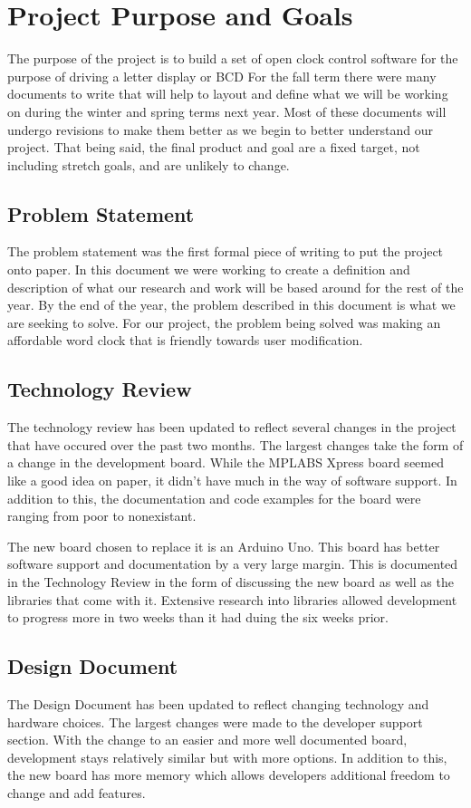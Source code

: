 \documentclass[onecolumn, draftclsnofoot,10pt, compsoc]{IEEEtran}
\begin{document}
\section{Project Purpose and Goals}
The purpose of the project is to build a set of open clock control software for the purpose of driving a letter display or BCD
For the fall term there were many documents to write that will help to layout and define what we will be working on during the winter and spring terms next year.
Most of these documents will undergo revisions to make them better as we begin to better understand our project.
That being said, the final product and goal are a fixed target, not including stretch goals, and are unlikely to change.

\subsection{Problem Statement}
The problem statement was the first formal piece of writing to put the project onto paper.
In this document we were working to create a definition and description of what our research and work will be based around for the rest of the year.
By the end of the year, the problem described in this document is what we are seeking to solve.
For our project, the problem being solved was making an affordable word clock that is friendly towards user modification.

\subsection{Technology Review}
The technology review has been updated to reflect several changes in the project that have occured over the past two months.
The largest changes take the form of a change in the development board.
While the MPLABS Xpress board seemed like a good idea on paper, it didn't have much in the way of software support.
In addition to this, the documentation and code examples for the board were ranging from poor to nonexistant.

The new board chosen to replace it is an Arduino Uno.
This board has better software support and documentation by a very large margin.
This is documented in the Technology Review in the form of discussing the new board as well as the libraries that come with it.
Extensive research into libraries allowed development to progress more in two weeks than it had duing the six weeks prior.

\subsection{Design Document}
The Design Document has been updated to reflect changing technology and hardware choices.
The largest changes were made to the developer support section.
With the change to an easier and more well documented board, development stays relatively similar but with more options.
In addition to this, the new board has more memory which allows developers additional freedom to change and add features.
\end{document}
